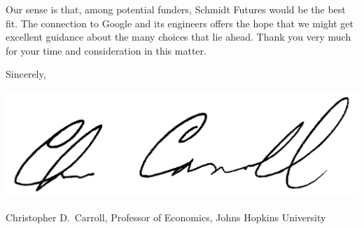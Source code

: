 \documentclass[11pt,pdftex,letterpaper]{article}
\begin{document}
Our sense is that, among potential funders, Schmidt Futures would be the best fit. The connection to Google and its engineers offers the hope that we might get excellent guidance about the many choices that lie ahead.
Thank you very much for your time and consideration in this matter.

\vspace{0.5cm}

{\parskip=2pt Sincerely,

  \includegraphics[scale=0.7]{CDCsignature.jpg}
  
Christopher D.\ Carroll, Professor of Economics, Johns Hopkins University}
\end{document}
